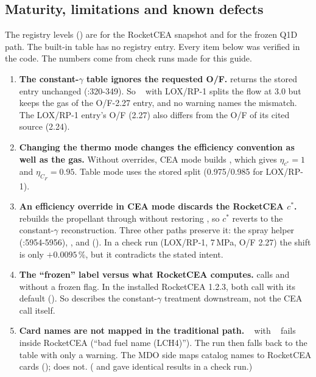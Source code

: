 \subsection{Maturity, limitations and known defects}\label{sec:s03-maturity}

The registry levels () are  for the RocketCEA snapshot and  for the frozen Q1D path. The built-in table has no registry entry. Every item below was verified in the code. The numbers come from check runs made for this guide.

\begin{enumerate}
\item \textbf{The constant-$\gamma$ table ignores the requested O/F.}  returns the stored entry unchanged (:320-349). So ~ with LOX/RP-1 splits the flow at 3.0 but keeps the gas of the O/F-2.27 entry, and no warning names the mismatch. The LOX/RP-1 entry's O/F (2.27) also differs from the O/F of its cited source (2.24).
\item \textbf{Changing the thermo mode changes the efficiency convention as well as the gas.} Without overrides, CEA mode builds , which gives $\eta_{c^*}=1$ and $\eta_{C_F}=0.95$. Table mode uses the stored split (0.975/0.985 for LOX/RP-1).
\item \textbf{An efficiency override in CEA mode discards the RocketCEA $c^*$.}  rebuilds the propellant through  without restoring , so $c^*$ reverts to the constant-$\gamma$ reconstruction. Three other paths preserve it: the spray helper (:5954-5956), , and  (). In a check run (LOX/RP-1, 7\,MPa, O/F 2.27) the shift is only $+0.0095\,\%$, but it contradicts the stated intent.
\item \textbf{The ``frozen'' label versus what RocketCEA computes.}  calls  and  without a frozen flag. In the installed RocketCEA 1.2.3, both call  with its default  (). So  describes the constant-$\gamma$ treatment downstream, not the CEA call itself.
\item \textbf{Card names are not mapped in the traditional path.} ~ with ~ fails inside RocketCEA (``bad fuel name (LCH4)''). The run then falls back to the table with only a warning. The MDO side maps catalog names to RocketCEA cards ();  does not. ( and  gave identical results in a check run.)

\end{enumerate}
